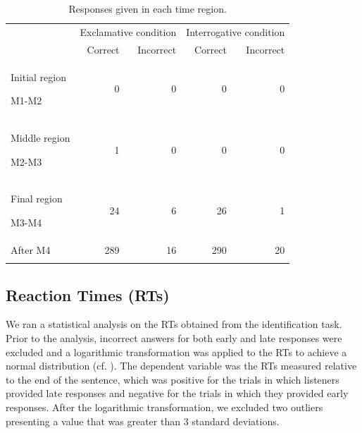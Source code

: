 \documentclass[output=paper]{langsci/langscibook}
\begin{document}
\begin{table}\small
\caption{Responses given in each time region.}
\label{tab:kel:1}

\begin{tabularx}{.9\textwidth}{X rrrr} 
\lsptoprule
& \multicolumn{2}{c}{{Exclamative condition}} & \multicolumn{2}{c}{{Interrogative condition}}\\
\cmidrule(lr){2-3}\cmidrule(lr){4-5} 
& {Correct } & {Incorrect } & {Correct } & {Incorrect }\\
\midrule
{Initial region}

M1-M2 & 0 & 0 & 0 & 0\\
\midrule
{Middle region}

M2-M3 & 1 & 0 & 0 & 0\\
\midrule
{Final region}

M3-M4 & 24 & 6 & 26 & 1\\
\midrule
After M4 & 289 & 16 & 290 & 20\\
\lspbottomrule
\end{tabularx}
\end{table}


   
\subsection{Reaction Times (RTs)}
\label{sec:kel:5.2}

We ran a statistical analysis on the RTs obtained from the identification task. Prior to the analysis, incorrect answers for both early and late responses were excluded and a logarithmic transformation was applied to the RTs to achieve a normal distribution (cf. \citealt{baayen2008analyzing}). The dependent variable was the RTs measured relative to the end of the sentence, which was positive for the trials in which listeners provided late responses and negative for the trials in which they provided early responses. After the logarithmic transformation, we excluded two outliers presenting a value that was greater than 3 standard deviations. 
\end{document}
